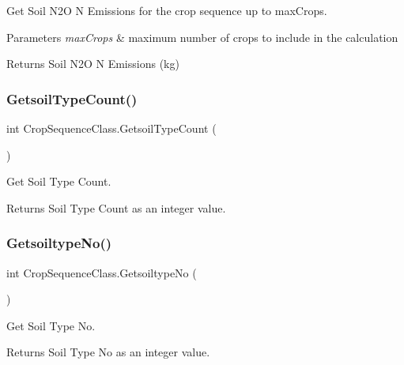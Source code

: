 Get Soil N2O N Emissions for the crop sequence up to max\+Crops. 


\begin{DoxyParams}{Parameters}
{\em max\+Crops} & maximum number of crops to include in the calculation \\
\hline
\end{DoxyParams}
\begin{DoxyReturn}{Returns}
Soil N2O N Emissions (kg) 
\end{DoxyReturn}
\mbox{\label{class_crop_sequence_class_a648e63847bb75686e6a3199f30d0087b}} 
\subsubsection{\texorpdfstring{GetsoilTypeCount()}{GetsoilTypeCount()}}
{\footnotesize\ttfamily int Crop\+Sequence\+Class.\+Getsoil\+Type\+Count (\begin{DoxyParamCaption}{ }\end{DoxyParamCaption})\hspace{0.3cm}{\ttfamily [inline]}}



Get Soil Type Count. 

\begin{DoxyReturn}{Returns}
Soil Type Count as an integer value. 
\end{DoxyReturn}
\mbox{\label{class_crop_sequence_class_a67028b47c354bfb43f638d6d031a23e7}} 
\subsubsection{\texorpdfstring{GetsoiltypeNo()}{GetsoiltypeNo()}}
{\footnotesize\ttfamily int Crop\+Sequence\+Class.\+Getsoiltype\+No (\begin{DoxyParamCaption}{ }\end{DoxyParamCaption})\hspace{0.3cm}{\ttfamily [inline]}}



Get Soil Type No. 

\begin{DoxyReturn}{Returns}
Soil Type No as an integer value. 
\end{DoxyReturn}
\mbox{\label{class_crop_sequence_class_aa75e7190f9466903705719d46718786b}} 

